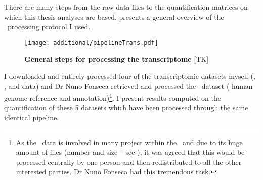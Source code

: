 There are many steps from the raw data files to the quantification matrices
on which this thesis analyses are based.  presents a
general overview of the \Rnaseq\ processing protocol I used.

\begin{figure}
    \texttt{[image: additional/pipelineTrans.pdf]}\centering
    \caption[General steps for processing the transcriptomic
    data]{\label{fig:pipelineTrans}\textbf{General steps for processing the
    transcriptome} [TK]}
\end{figure}

I downloaded and entirely processed four of the transcriptomic datasets
myself (, ,  and 
data) and Dr Nuno Fonseca retrieved and processed the \Gtex\ dataset (
human genome reference and  annotation)\footnote{As
the \Gtex\ data is involved in many project within the \EBI\
and due to its huge amount of files (number and  size -- see ),
it was agreed that this would be processed centrally by one person and then
redistributed to all the other interested parties. Dr Nuno Fonseca had this
tremendous task.}. I present results computed on the quantification of these
5 datasets which have been processed through the same identical pipeline.


